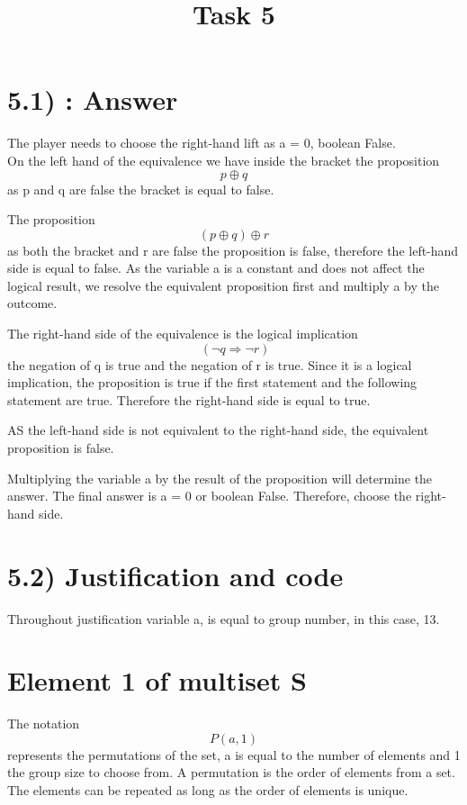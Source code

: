 \documentclass{article}
\title{Task 5}
\author{}
\date{}
\begin{document}
\maketitle

\section*{5.1) : Answer}

The player needs to choose the right-hand lift as a = 0, boolean False.
\\On the left hand of the equivalence we have inside the bracket the proposition\[p
 \oplus q
\] as p and q are false the bracket is equal to false. 

\vspace{0.3cm} The proposition 
\[
(p \oplus q) \oplus r
\] as both the bracket and r are false the proposition is false, therefore the left-hand side is equal to false.
 As the variable a is a constant and does not affect the logical result, we resolve the equivalent proposition first and multiply a by the outcome.

\vspace{0.3cm}The right-hand side of the equivalence is the logical implication\[
\ (\neg q \Rightarrow \neg r)
\] the negation of q is true and the negation of r is true. Since it is a logical implication, the proposition is true if the first statement and the following statement are true. Therefore the right-hand side is equal to true.

\vspace{0.3cm} AS the left-hand side is not equivalent to the right-hand side, the equivalent proposition is false.

Multiplying the variable a by the result of the proposition will determine the answer.
 The final answer is a = 0 or boolean False.
 Therefore, choose the right-hand side.



\section*{5.2) Justification and code }
 Throughout justification variable a, is equal to group number, in this case, 13. 
\vspace{0.3cm}\section*{Element 1 of multiset S}

The notation\[P(a, 1)\]  represents the permutations of the set, a is equal to the number of elements and 1 the group size to choose from.
A permutation is the order of elements from a set. The elements can be repeated as long as the order of elements is unique.
\end{document}
